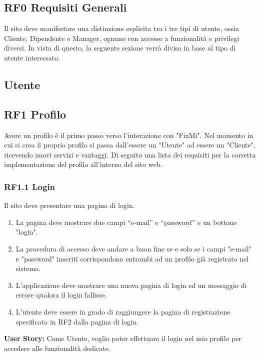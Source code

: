 \documentclass{report}
\begin{document}
\subsection*{RF0 Requisiti Generali}
Il sito deve manifestare una distinzione esplicita tra i tre tipi di utente, ossia Cliente, Dipendente e Manager, ognuno con accesso a funzionalità e privilegi diversi.
In vista di questo, la seguente sezione verrà divisa in base al tipo di utente interessato.

\subsection{Utente}

\subsection*{RF1 Profilo}

Avere un profilo è il primo passo verso l'interazione con "FixMi". Nel momento in cui si crea il proprio profilo si passa dall'essere un "Utente" ad essere un "Cliente", ricevendo nuovi servizi e vantaggi. Di seguito una lista dei requisiti per la corretta implementazione del profilo all'interno del sito web.

\subsubsection*{RF1.1 Login}

Il sito deve presentare una pagina di login.

\begin{enumerate}
	\item La pagina deve mostrare due campi “e-mail” e “password” e un bottone "login".
	
	\item La procedura di accesso deve andare a buon fine se e solo se i campi "e-mail" e "password" inseriti corrispondono entrambi ad un profilo già registrato nel sistema.
	
	\item L'applicazione deve mostrare una nuova pagina di login ed un messaggio di errore qualora il login fallisse.
	
	\item L’utente deve essere in grado di raggiungere la pagina di registrazione specificata in RF2 dalla pagina di login.
\end{enumerate}


\textbf{User Story:}
Come Utente, voglio poter effettuare il login nel mio profilo per accedere alle funzionalità dedicate.
\end{document}
